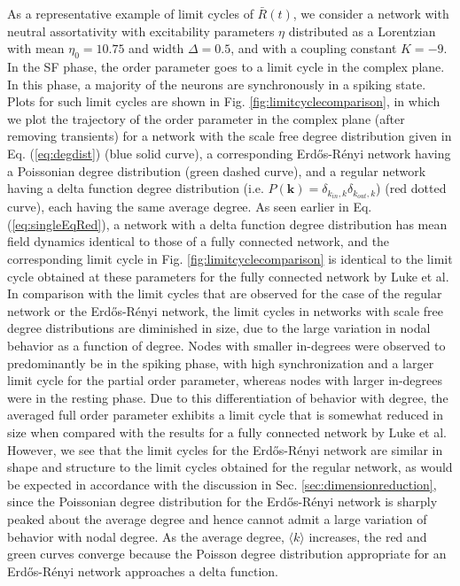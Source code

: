 \documentclass[%
 aip,
 sd,%
 amsmath,amssymb,
 reprint,%
]{revtex4-1}
\begin{document}
As a representative example of limit cycles of $\bar{R}(t)$, we consider a network with neutral assortativity with excitability parameters $\eta$ distributed as a Lorentzian with mean $\eta_0=10.75$ and width $\Delta = 0.5$, and with a coupling constant $K=-9$.
In the SF phase, the order parameter goes to a limit cycle in the complex plane. In this phase, a majority of the neurons are synchronously in a spiking state. Plots for such limit cycles are shown in Fig. \ref{fig:limitcyclecomparison}, in which we plot the trajectory of the order parameter in the complex plane (after removing transients) for a network with the scale free degree distribution given in Eq. (\ref{eq:degdist}) (blue solid curve), a corresponding Erd\H{o}s-R\'{e}nyi network having a Poissonian degree distribution (green dashed curve), and a regular network having a delta function degree distribution (i.e. $P(\mathbf{k})=\delta_{k_{in}, k} \delta_{k_{out}, k}$) (red dotted curve), each having the same average degree. As seen earlier in Eq. (\ref{eq:singleEqRed}), a network with a delta function degree distribution has mean field dynamics identical to those of a fully connected network, and the corresponding limit cycle in Fig. \ref{fig:limitcyclecomparison} is identical to the limit cycle obtained at these parameters for the fully connected network by Luke et al.\cite{luke2013complete}
In comparison with the limit cycles that are observed for the case of the regular network or the Erd\H{o}s-R\'{e}nyi network, the limit cycles in networks with scale free degree distributions are diminished in size, due to the large variation in nodal behavior as a function of degree. Nodes with smaller in-degrees were observed to predominantly be in the spiking phase, with high synchronization and a larger limit cycle for the partial order parameter, whereas nodes with larger in-degrees were in the resting phase. Due to this differentiation of behavior with degree, the averaged full order parameter exhibits a limit cycle that is somewhat reduced in size when compared with the results for a fully connected network by Luke et al\cite{luke2013complete}. However, we see that the limit cycles for the Erd\H{o}s-R\'{e}nyi network are similar in shape and structure to the limit cycles obtained for the regular network, as would be expected in accordance with the discussion in Sec. \ref{sec:dimensionreduction}, since the Poissonian degree distribution for the Erd\H{o}s-R\'{e}nyi network is sharply peaked about the average degree and hence cannot admit a large variation of behavior with nodal degree. As the average degree, $\langle k \rangle$ increases, the red and green curves converge because the Poisson degree distribution appropriate for an  Erd\H{o}s-R\'{e}nyi network approaches a delta function.
\end{document}
